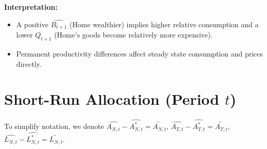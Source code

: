 \documentclass[a4paper,12pt]{article} %
\theoremstyle{nonitalic}
\begin{document}
\textbf{Interpretation:}
\begin{itemize}
    \item A positive $ \widehat{B_{t+1}} $ (Home wealthier) implies higher relative consumption and a lower $ Q_{t+1} $ (Home’s goods become relatively more expensive).
    \item Permanent productivity differences affect steady state consumption and prices directly.
\end{itemize}

\section{Short-Run Allocation (Period $t$)}
To simplify notation, we denote $ \widehat{A_{N,t}} - \widehat{A_{N,t}^*}  = \widetilde{A_{N,t}}$, $ \widehat{A_{T,t}} - \widehat{A_{T,t}^*}  = \widetilde{A_{T,t}}$, $ \widehat{L_{N,t}} - \widehat{L_{N,t}^*}  = \widetilde{L_{N,t}}$. 
\end{document}
